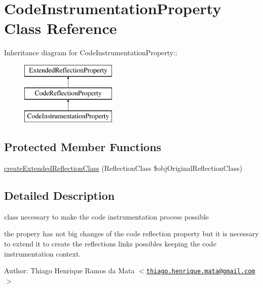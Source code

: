 \hypertarget{class_code_instrumentation_property}{
\section{CodeInstrumentationProperty Class Reference}
\label{class_code_instrumentation_property}
}
Inheritance diagram for CodeInstrumentationProperty::\begin{figure}[H]
\begin{center}
\leavevmode
\includegraphics[height=3cm]{class_code_instrumentation_property}
\end{center}
\end{figure}
\subsection*{Protected Member Functions}
\begin{CompactItemize}
\item 
\hyperlink{class_code_instrumentation_property_6b56ec198bc6a5b5a72076e4e7c19e29}{createExtendedReflectionClass} (ReflectionClass \$objOriginalReflectionClass)
\end{CompactItemize}


\subsection{Detailed Description}
class necessary to make the code instrumentation process possible

the propery has not big changes of the code reflection property but it is necessary to extend it to create the reflections links possibles keeping the code instrumentation context.

\begin{Desc}
\item[Author:]Thiago Henrique Ramos da Mata $<$\href{mailto:thiago.henrique.mata@gmail.com}{\tt thiago.henrique.mata@gmail.com}$>$ \end{Desc}


